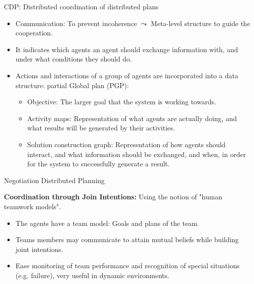 \documentclass[9pt]{beamer}
\begin{document}
\begin{frame}{CDP: Distributed coordination of distributed plans}
\begin{small}

\begin{itemize}
\item \textcolor{CS-1light}{Communication}: To prevent incoherence $\leadsto$ \textcolor{CS-1light}{Meta-level structure} to guide the cooperation.
\item It indicates which agents an agent should exchange information with, and under what conditions they should do. 
\item Actions and interactions of a group of agents are incorporated into a data structure: \textcolor{CS-1light}{partial Global plan (PGP)}:
\begin{itemize}
\item \textcolor{CS-1light}{Objective}: The larger goal that the system is working towards.
\item \textcolor{CS-1light}{Activity maps}: Representation of what agents are actually doing, and what results will be generated by their activities.
\item \textcolor{CS-1light}{Solution construction graph}: Representation of how agents should interact, and what information should be exchanged, and when, in order for the system to successfully generate a result.
\end{itemize}
\end{itemize}

\end{small}
\end{frame}

\begin{frame}{Negotiation Distributed Planning}
\begin{small}

\textbf{Coordination through Join Intentions:} Using the notion of "\textcolor{CS-1light}{human teamwork models}".

\begin{itemize}
\item The agents have a team model: Goals and plans of the team.
\item Teams members may communicate to attain mutual beliefs while building joint intentions. 
\item Ease monitoring of team performance and recognition of special situations (e.g. failure), very useful in dynamic environments.
\end{itemize}

\end{small}
\end{frame}
\end{document}
